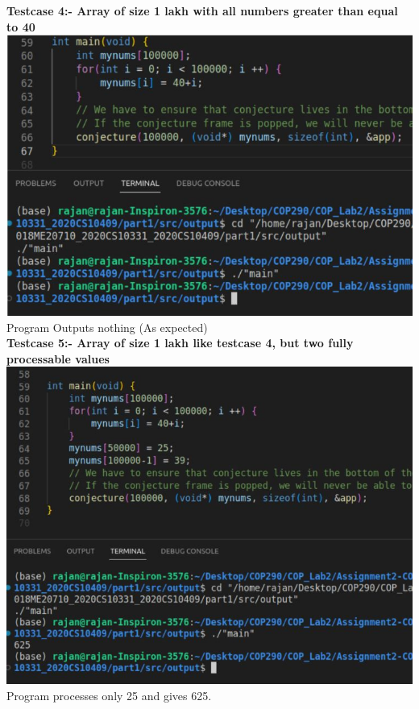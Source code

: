 \documentclass[12pt]{article}
\begin{document}
\begin{spacing}{1.2}
    \newpage
    
\textbf{Testcase 4:- Array of size 1 lakh with all numbers greater than equal to 40}\\
\includegraphics[width=15cm]{images/5.jpg}\\
Program Outputs nothing (As expected)\\



\textbf{Testcase 5:- Array of size 1 lakh like testcase 4, but two fully processable values}\\
\includegraphics[width=15cm]{images/6.jpg}\\
{Program processes only 25 and gives 625.}\\


\end{spacing}
\end{document}

